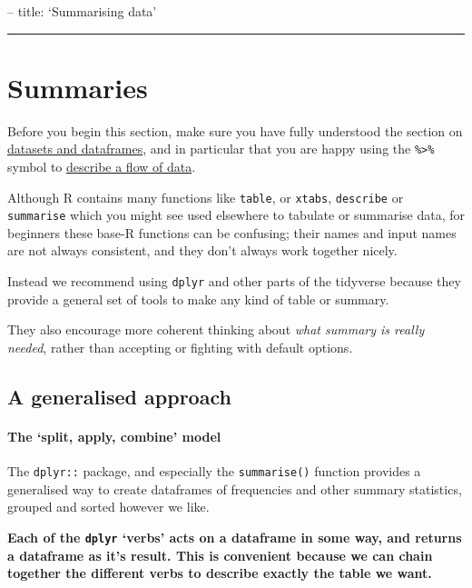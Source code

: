 \documentclass[]{article}
\let\oldparagraph\paragraph
\renewcommand{\paragraph}[1]{\oldparagraph{#1}\mbox{}}
\begin{document}
-- title: `Summarising data'

\begin{center}\rule{0.5\linewidth}{\linethickness}\end{center}

\hypertarget{summarising-data}{%
\section{Summaries}\label{summarising-data}}

Before you begin this section, make sure you have fully understood the section
on \href{datasets.html}{datasets and dataframes}, and in particular that you are
happy using the \texttt{\%\textgreater{}\%} symbol to \protect\hyperlink{pipes}{describe a flow of data}.

Although R contains many functions like \texttt{table}, or \texttt{xtabs}, \texttt{describe} or
\texttt{summarise} which you might see used elsewhere to tabulate or summarise data,
for beginners these base-R functions can be confusing; their names and input
names are not always consistent, and they don't always work together nicely.

Instead we recommend using \texttt{dplyr} and other parts of the tidyverse because they
provide a general set of tools to make any kind of table or summary.

They also encourage more coherent thinking about \emph{what summary is really
needed}, rather than accepting or fighting with default options.

\hypertarget{dplyr-general}{%
\subsection*{A generalised approach}\label{dplyr-general}}

\hypertarget{split-apply-combine}{%
\paragraph{The `split, apply, combine' model}\label{split-apply-combine}}

The \texttt{dplyr::} package, and especially the \texttt{summarise()} function provides a
generalised way to create dataframes of frequencies and other summary
statistics, grouped and sorted however we like.

\textbf{Each of the \texttt{dplyr} `verbs' acts on a dataframe in some way, and returns a
dataframe as it's result. This is convenient because we can chain together the
different verbs to describe exactly the table we want.}
\end{document}
